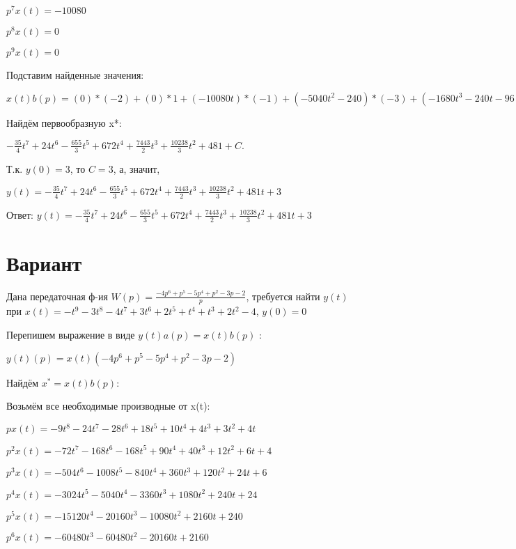 \documentclass{article}
\begin{document}
{{{{$p^7x(t)=-10080$

$p^8x(t)=0$

$p^9x(t)=0$

Подставим найденные значения:

$x(t)b(p) = (0)*(-2)+(0)*1+(-10080t)*(-1)+(-5040t^{2}-240)*(-3)+(-1680t^{3}-240t-96)*(-2)+(-420t^{4}-120t^{2}-96t+12)*3+(-84t^{5}-40t^{3}-48t^{2}+12t-2)*(-2)+(-14t^{6}-10t^{4}-16t^{3}+6t^{2}-2t+2)*3+(-14t^{6}-10t^{4}-16t^{3}+6t^{2}-2t+2)*2=-70t^{6}+168t^{5}-1310t^{4}+3360t^{3}+14886t^{2}+10238t$





Найдём первообразную x*:

$-\frac{35}{4}t^{7}+24t^{6}-\frac{655}{3}t^{5}+672t^{4}+\frac{7443}{2}t^{3}+\frac{10238}{3}t^{2}+481+C.$

Т.к. $y(0)=3$, то $C=3$, а, значит, 

$y(t)=-\frac{35}{4}t^{7}+24t^{6}-\frac{655}{3}t^{5}+672t^{4}+\frac{7443}{2}t^{3}+\frac{10238}{3}t^{2}+481t+3$

Ответ: $y(t) = -\frac{35}{4}t^{7}+24t^{6}-\frac{655}{3}t^{5}+672t^{4}+\frac{7443}{2}t^{3}+\frac{10238}{3}t^{2}+481t+3$

\section{Вариант}

Дана передаточная ф-ия $W(p)=\frac{-4p^{6}+p^{5}-5p^{4}+p^{2}-3p-2}{p}$, требуется найти $y(t)$ при $x(t)=-t^{9}-3t^{8}-4t^{7}+3t^{6}+2t^{5}+t^{4}+t^{3}+2t^{2}-4$, $y(0)=0$

Перепишем выражение в виде $y(t)a(p)=x(t)b(p)$ :

$y(t)(p)=x(t)(-4p^{6}+p^{5}-5p^{4}+p^{2}-3p-2)$

Найдём $x^*=x(t)b(p)$:

Возьмём все необходимые производные от x(t):

$px(t)=-9t^{8}-24t^{7}-28t^{6}+18t^{5}+10t^{4}+4t^{3}+3t^{2}+4t$

$p^2x(t)=-72t^{7}-168t^{6}-168t^{5}+90t^{4}+40t^{3}+12t^{2}+6t+4$

$p^3x(t)=-504t^{6}-1008t^{5}-840t^{4}+360t^{3}+120t^{2}+24t+6$

$p^4x(t)=-3024t^{5}-5040t^{4}-3360t^{3}+1080t^{2}+240t+24$

$p^5x(t)=-15120t^{4}-20160t^{3}-10080t^{2}+2160t+240$

$p^6x(t)=-60480t^{3}-60480t^{2}-20160t+2160$

}}}}
\end{document}
